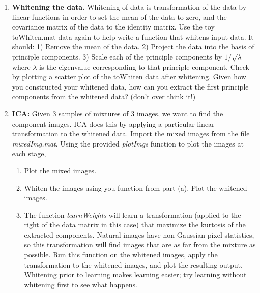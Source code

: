\documentclass{article}
\begin{document}
\begin{itemize}
\begin{enumerate}[label=\alph*)]
\begin{enumerate}[label=(\roman*)]
    \end{enumerate}


    \item \textbf{ Whitening the data.} Whitening of data is transformation of the data by linear functions in order to set the mean of the data to zero, and the covariance matrix of the data to the identity matrix. Use the toy toWhiten.mat data again to help write a function that whitens input data. It should: 1) Remove the mean of the data. 2) Project the data into the basis of principle components. 3) Scale each of the principle components by $1 / \sqrt{\lambda}$ where $\lambda$ is the eigenvalue corresponding to that principle component. Check by plotting a scatter plot of the toWhiten data after whitening. Given how you constructed your whitened data, how can you extract the first principle components from the whitened data? (don't over think it!)


    \item \textbf{ICA:} Given 3 samples of mixtures of 3 images, we want to find the component images. ICA does this by applying a particular linear transformation to the whitened data. Import the mixed images from the file \textit{mixedImg.mat}. Using the provided \textit{plotImgs} function to plot the images at each stage,
    \begin{enumerate}[label=(\roman*)]
        \item Plot the mixed images.
        \item Whiten the images using you function from part (a). Plot the whitened images.
        \item The function \textit{learnWeights} will learn a transformation (applied to the right of the data matrix in this case) that maximize the kurtosis of the extracted components. Natural images have non-Gaussian pixel statistics, so this transformation will find images that are as far from the mixture as possible. Run this function on the whitened images, apply the transformation to the whitened images, and plot the resulting output. Whitening prior to learning makes learning easier; try learning without whitening first to see what happens.

    \end{enumerate}


\end{enumerate}





\end{itemize}
 
\end{document}
